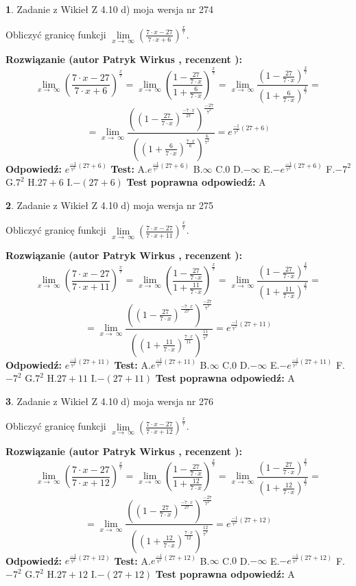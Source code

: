 \documentclass[12pt, a4paper]{article}
\theoremstyle{definition} %
\newtheorem{zad}{}
\newcommand{\zadStart}[1]{\begin{zad}#1\newline}
\newcommand{\zadStop}{\end{zad}}
\newcommand{\rozwStart}[2]{\noindent \textbf{Rozwiązanie (autor #1 , recenzent #2): }\newline}
\newcommand{\rozwStop}{\newline}
\newcommand{\odpStart}{\noindent \textbf{Odpowiedź:}\newline}
\newcommand{\odpStop}{\newline}
\newcommand{\testStart}{\noindent \textbf{Test:}\newline}
\newcommand{\testStop}{\newline}
\newcommand{\kluczStart}{\noindent \textbf{Test poprawna odpowiedź:}\newline}
\newcommand{\kluczStop}{\newline}
\begin{document}
\zadStart{Zadanie z Wikieł Z 4.10 d) moja wersja nr 274}


Obliczyć granicę funkcji  $\lim\limits_{x\to\ \infty}(\frac{7\cdot x-27}{7\cdot x+6})^{\frac{x}{7}}$.
\zadStop
\rozwStart{Patryk Wirkus}{}
$$\lim\limits_{x\to\ \infty}(\frac{7\cdot x-27}{7\cdot x+6})^{\frac{x}{7}} = \lim\limits_{x\to\ \infty}(\frac{1-\frac{27}{7\cdot x}}{1+\frac{6}{7\cdot x}})^{\frac{x}{7}}=\lim\limits_{x\to\ \infty}\frac{(1-\frac{27}{7\cdot x})^{\frac{x}{7}}}{(1+\frac{6}{7\cdot x})^{\frac{x}{7}}}=$$
$$=\lim\limits_{x\to\ \infty}\frac{((1-\frac{27}{7\cdot x})^{\frac{-7\cdot x}{27}})^{\frac{-27}{7^{2}}}}{((1+\frac{6}{7\cdot x})^{\frac{7\cdot x}{6}})^{\frac{6}{7^{2}}}}=e^{\frac{-1}{7^{2}}(27+6)}$$
\rozwStop
\odpStart
$e^{\frac{-1}{7^{2}}(27+6)}$
\odpStop
\testStart
A.$e^{\frac{-1}{7^{2}}(27+6)}$ B.$\infty$ C.$0$ D.$-\infty$ E.$-e^{\frac{-1}{7^{2}}(27+6)}$
F.$-7^{2}$ G.$7^{2}$
H.$27+6$
I.$-(27+6)$
\testStop
\kluczStart
A
\kluczStop



\zadStart{Zadanie z Wikieł Z 4.10 d) moja wersja nr 275}


Obliczyć granicę funkcji  $\lim\limits_{x\to\ \infty}(\frac{7\cdot x-27}{7\cdot x+11})^{\frac{x}{7}}$.
\zadStop
\rozwStart{Patryk Wirkus}{}
$$\lim\limits_{x\to\ \infty}(\frac{7\cdot x-27}{7\cdot x+11})^{\frac{x}{7}} = \lim\limits_{x\to\ \infty}(\frac{1-\frac{27}{7\cdot x}}{1+\frac{11}{7\cdot x}})^{\frac{x}{7}}=\lim\limits_{x\to\ \infty}\frac{(1-\frac{27}{7\cdot x})^{\frac{x}{7}}}{(1+\frac{11}{7\cdot x})^{\frac{x}{7}}}=$$
$$=\lim\limits_{x\to\ \infty}\frac{((1-\frac{27}{7\cdot x})^{\frac{-7\cdot x}{27}})^{\frac{-27}{7^{2}}}}{((1+\frac{11}{7\cdot x})^{\frac{7\cdot x}{11}})^{\frac{11}{7^{2}}}}=e^{\frac{-1}{7^{2}}(27+11)}$$
\rozwStop
\odpStart
$e^{\frac{-1}{7^{2}}(27+11)}$
\odpStop
\testStart
A.$e^{\frac{-1}{7^{2}}(27+11)}$ B.$\infty$ C.$0$ D.$-\infty$ E.$-e^{\frac{-1}{7^{2}}(27+11)}$
F.$-7^{2}$ G.$7^{2}$
H.$27+11$
I.$-(27+11)$
\testStop
\kluczStart
A
\kluczStop



\zadStart{Zadanie z Wikieł Z 4.10 d) moja wersja nr 276}


Obliczyć granicę funkcji  $\lim\limits_{x\to\ \infty}(\frac{7\cdot x-27}{7\cdot x+12})^{\frac{x}{7}}$.
\zadStop
\rozwStart{Patryk Wirkus}{}
$$\lim\limits_{x\to\ \infty}(\frac{7\cdot x-27}{7\cdot x+12})^{\frac{x}{7}} = \lim\limits_{x\to\ \infty}(\frac{1-\frac{27}{7\cdot x}}{1+\frac{12}{7\cdot x}})^{\frac{x}{7}}=\lim\limits_{x\to\ \infty}\frac{(1-\frac{27}{7\cdot x})^{\frac{x}{7}}}{(1+\frac{12}{7\cdot x})^{\frac{x}{7}}}=$$
$$=\lim\limits_{x\to\ \infty}\frac{((1-\frac{27}{7\cdot x})^{\frac{-7\cdot x}{27}})^{\frac{-27}{7^{2}}}}{((1+\frac{12}{7\cdot x})^{\frac{7\cdot x}{12}})^{\frac{12}{7^{2}}}}=e^{\frac{-1}{7^{2}}(27+12)}$$
\rozwStop
\odpStart
$e^{\frac{-1}{7^{2}}(27+12)}$
\odpStop
\testStart
A.$e^{\frac{-1}{7^{2}}(27+12)}$ B.$\infty$ C.$0$ D.$-\infty$ E.$-e^{\frac{-1}{7^{2}}(27+12)}$
F.$-7^{2}$ G.$7^{2}$
H.$27+12$
I.$-(27+12)$
\testStop
\kluczStart
A
\kluczStop
\end{document}
